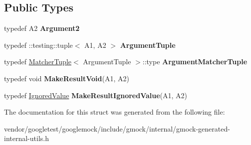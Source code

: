 \subsection*{Public Types}
\begin{DoxyCompactItemize}
\item 
\mbox{\label{structtesting_1_1internal_1_1_function_3_01_r_07_a1_00_01_a2_08_4_a025f5192252366d73aa19718bb0ea89d}} 
typedef A2 {\bfseries Argument2}
\item 
\mbox{\label{structtesting_1_1internal_1_1_function_3_01_r_07_a1_00_01_a2_08_4_a2de00437877c29ec6cb78396928b8e3e}} 
typedef \+::testing\+::tuple$<$ A1, A2 $>$ {\bfseries Argument\+Tuple}
\item 
\mbox{\label{structtesting_1_1internal_1_1_function_3_01_r_07_a1_00_01_a2_08_4_ad07042129ff6370f55a279ad12f5e80f}} 
typedef \hyperlink{structtesting_1_1internal_1_1_matcher_tuple}{Matcher\+Tuple}$<$ Argument\+Tuple $>$\+::type {\bfseries Argument\+Matcher\+Tuple}
\item 
\mbox{\label{structtesting_1_1internal_1_1_function_3_01_r_07_a1_00_01_a2_08_4_ada1ad22fa21c84ec3faea47ed20c1b46}} 
typedef void {\bfseries Make\+Result\+Void}(A1, A2)
\item 
\mbox{\label{structtesting_1_1internal_1_1_function_3_01_r_07_a1_00_01_a2_08_4_a89033ea870fe831b13899ce36666e102}} 
typedef \hyperlink{classtesting_1_1internal_1_1_ignored_value}{Ignored\+Value} {\bfseries Make\+Result\+Ignored\+Value}(A1, A2)
\end{DoxyCompactItemize}


The documentation for this struct was generated from the following file\+:\begin{DoxyCompactItemize}
\item 
vendor/googletest/googlemock/include/gmock/internal/gmock-\/generated-\/internal-\/utils.\+h\end{DoxyCompactItemize}
